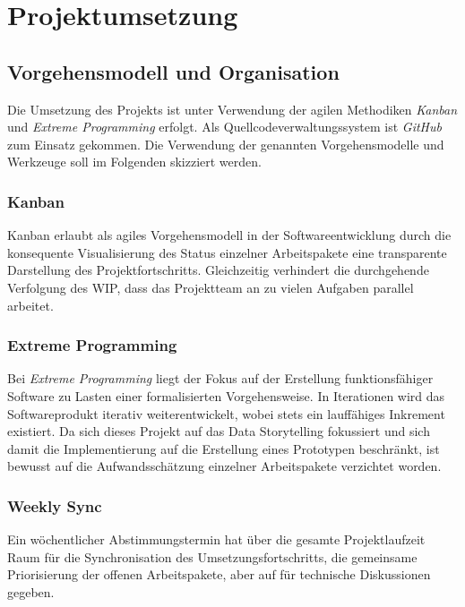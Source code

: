\newpage

\section{Projektumsetzung}
\label{projektumsetzung}

\subsection{Vorgehensmodell und Organisation}
\label{Vorgehensmodelle_und_organisation}

Die Umsetzung des Projekts ist unter Verwendung der agilen Methodiken \emph{Kanban} und \emph{Extreme Programming} erfolgt. Als Quellcodeverwaltungssystem ist \emph{GitHub} zum Einsatz gekommen. Die Verwendung der genannten Vorgehensmodelle und Werkzeuge soll im Folgenden skizziert werden.

\subsubsection{Kanban}
\label{kanban}

Kanban erlaubt als agiles Vorgehensmodell in der Softwareentwicklung durch die konsequente Visualisierung des Status einzelner Arbeitspakete eine transparente Darstellung des Projektfortschritts. Gleichzeitig verhindert die durchgehende Verfolgung des \ac{WIP}, dass das Projektteam an zu vielen Aufgaben parallel arbeitet.

\subsubsection{Extreme Programming}
\label{extreme_programming}

Bei \emph{Extreme Programming} liegt der Fokus auf der Erstellung funktionsfähiger Software zu Lasten einer formalisierten Vorgehensweise. In Iterationen wird das Softwareprodukt iterativ weiterentwickelt, wobei stets ein lauffähiges Inkrement existiert. Da sich dieses Projekt auf das Data Storytelling fokussiert und sich damit die Implementierung auf die Erstellung eines Prototypen beschränkt, ist bewusst auf die Aufwandsschätzung einzelner Arbeitspakete verzichtet worden.

\subsubsection{Weekly Sync}
\label{weekly_sync}

Ein wöchentlicher Abstimmungstermin hat über die gesamte Projektlaufzeit Raum für die Synchronisation des Umsetzungsfortschritts, die gemeinsame Priorisierung der offenen Arbeitspakete, aber auf für technische Diskussionen gegeben.

